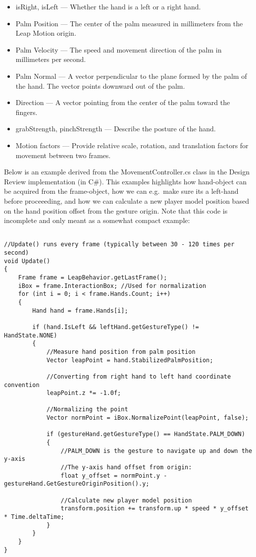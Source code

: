 \begin{itemize}
\item isRight, isLeft — Whether the hand is a left or a right hand.
\item Palm Position — The center of the palm measured in millimeters from the Leap Motion origin.
\item Palm Velocity — The speed and movement direction of the palm in millimeters per second.
\item Palm Normal — A vector perpendicular to the plane formed by the palm of the hand. The vector points downward out of the palm.
\item Direction — A vector pointing from the center of the palm toward the fingers.
\item grabStrength, pinchStrength — Describe the posture of the hand.
\item Motion factors — Provide relative scale, rotation, and translation factors for movement between two frames.
\end{itemize}

Below is an example derived from the MovementController.cs class in the Design Review implementation (in C\#). 
This examples highlights how hand-object can be acquired from the frame-object, how we can e.g.~make sure its a left-hand
before proceeeding, and how we can calculate a new player model position based on the hand position offset from the gesture origin.
Note that this code is incomplete and only meant as a somewhat compact example:

\lstset{style=csharp}
\begin{lstlisting}

//Update() runs every frame (typically between 30 - 120 times per second)
void Update()
{
    Frame frame = LeapBehavior.getLastFrame();
    iBox = frame.InteractionBox; //Used for normalization
    for (int i = 0; i < frame.Hands.Count; i++)
    {
        Hand hand = frame.Hands[i]; 

        if (hand.IsLeft && leftHand.getGestureType() != HandState.NONE)
        {
            //Measure hand position from palm position
            Vector leapPoint = hand.StabilizedPalmPosition;
            
            //Converting from right hand to left hand coordinate convention
            leapPoint.z *= -1.0f; 

            //Normalizing the point
            Vector normPoint = iBox.NormalizePoint(leapPoint, false);
            
            if (gestureHand.getGestureType() == HandState.PALM_DOWN) 
            {
                //PALM_DOWN is the gesture to navigate up and down the y-axis          
                //The y-axis hand offset from origin:
                float y_offset = normPoint.y - gestureHand.GetGestureOriginPosition().y;

                //Calculate new player model position
                transform.position += transform.up * speed * y_offset * Time.deltaTime;
            }             
        }
    }
}
\end{lstlisting}

